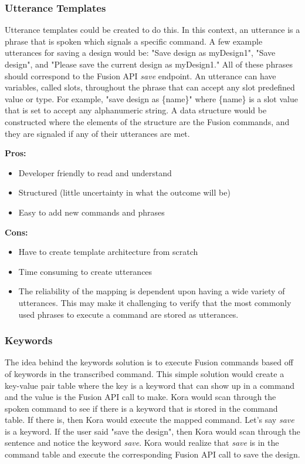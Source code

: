 \documentclass[onecolumn, draftclsnofoot,10pt, compsoc]{IEEEtran}
\begin{document}
	\subsubsection{Utterance Templates}
	Utterance templates could be created to do this.
	In this context, an utterance is a phrase that is spoken which signals a specific command.
	A few example utterances for saving a design would be: "Save design as myDesign1", "Save design", and "Please save the current design as myDesign1."
	All of these phrases should correspond to the Fusion API \textit{save} endpoint.
	An utterance can have variables, called slots, throughout the phrase that can accept any slot predefined value or type.
	For example, "save design as \{name\}" where \{name\} is a slot value that is set to accept any alphanumeric string.
	A data structure would be constructed where the elements of the structure are the Fusion commands, and they are signaled if any of their utterances are met.

	\textbf{Pros:}
	\begin{itemize}
		\item{
			Developer friendly to read and understand}
		\item{
			Structured (little uncertainty in what the outcome will be)}
		\item{
			Easy to add new commands and phrases}
	\end{itemize}

	\textbf{Cons:}
	\begin{itemize}
		\item{
			Have to create template architecture from scratch}
		\item{
			Time consuming to create utterances}
		\item{
			The reliability of the mapping is dependent upon having a wide variety of utterances.
			This may make it challenging to verify that the most commonly used phrases to execute a command are stored as utterances.}
	\end{itemize}



	\subsubsection{Keywords}
	The idea behind the keywords solution is to execute Fusion commands based off of keywords in the transcribed command.
	This simple solution would create a key-value pair table where the key is a keyword that can show up in a command and the value is the Fusion API call to make.
	Kora would scan through the spoken command to see if there is a keyword that is stored in the command table.
	If there is, then Kora would execute the mapped command.
	Let's say \textit{save} is a keyword.
	If the user said "save the design", then Kora would scan through the sentence and notice the keyword \textit{save}.
	Kora would realize that \textit{save} is in the command table and execute the corresponding Fusion API call to save the design.
\end{document}
